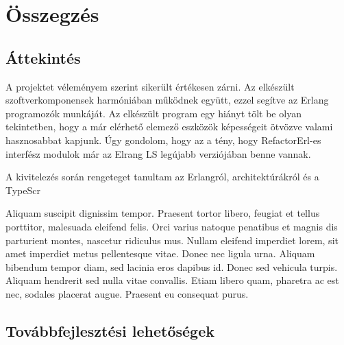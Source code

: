 \chapter{Összegzés}
\label{ch:sum}

\section{Áttekintés}

A projektet véleményem szerint sikerült értékesen zárni. Az elkészült szoftverkomponensek harmóniában működnek együtt, ezzel segítve az Erlang programozók munkáját. Az elkészült program egy hiányt tölt be olyan tekintetben, hogy a már elérhető elemező eszközök képességeit ötvözve valami hasznosabbat kapjunk. Úgy gondolom, hogy az a tény, hogy RefactorErl-es interfész modulok már az Elrang LS legújabb verziójában benne vannak.

A kivitelezés során rengeteget tanultam az Erlangról, architektúrákról és a TypeScr

Aliquam suscipit dignissim tempor. Praesent tortor libero, feugiat et tellus porttitor, malesuada eleifend felis. Orci varius natoque penatibus et magnis dis parturient montes, nascetur ridiculus mus. Nullam eleifend imperdiet lorem, sit amet imperdiet metus pellentesque vitae. Donec nec ligula urna. Aliquam bibendum tempor diam, sed lacinia eros dapibus id. Donec sed vehicula turpis. Aliquam hendrerit sed nulla vitae convallis. Etiam libero quam, pharetra ac est nec, sodales placerat augue. Praesent eu consequat purus.

\section{Továbbfejlesztési lehetőségek}